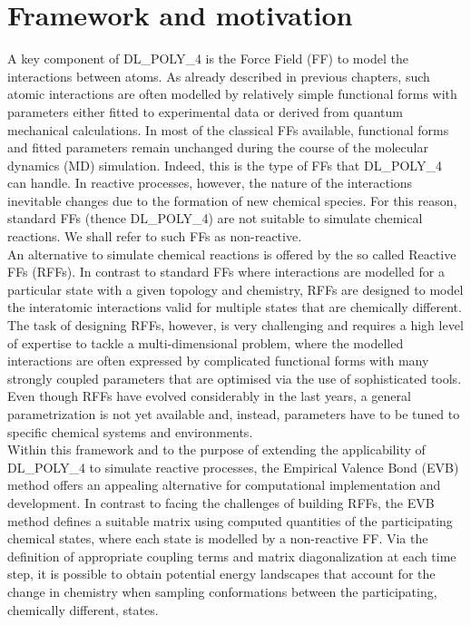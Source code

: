 \section{Framework and motivation}
A key component of DL\_POLY\_4 is the Force Field (FF) to model the interactions between atoms. As already described in previous chapters, such atomic interactions are often modelled by relatively simple functional forms with parameters either fitted to experimental data or derived from quantum mechanical calculations. In most of the classical FFs available, functional forms and fitted parameters remain unchanged during the course of the molecular dynamics (MD) simulation. Indeed, this is the type of FFs that DL\_POLY\_4 can handle. In reactive processes, however, the nature of the interactions inevitable changes due to the formation of new chemical species. For this reason, standard FFs (thence DL\_POLY\_4) are not suitable to simulate chemical reactions. We shall refer to such FFs as non-reactive.\\ 
An alternative to simulate chemical reactions is offered by the so called Reactive FFs (RFFs). In contrast to standard FFs where interactions are modelled for a particular state with a given topology and chemistry, RFFs are designed to model the interatomic interactions valid for multiple states that are chemically different. The task of designing RFFs, however, is very challenging and requires a high level of expertise to tackle a multi-dimensional problem, where the modelled interactions are often expressed by complicated functional forms with many strongly coupled parameters that are optimised via the use of sophisticated tools. Even though RFFs have evolved considerably in the last years, a general parametrization is not yet available and, instead, parameters have to be tuned to specific chemical systems and environments.\\
Within this framework and to the purpose of extending the applicability of DL\_POLY\_4 to simulate reactive processes, the Empirical Valence Bond (EVB) method \cite{duarte2017} offers an appealing alternative for computational implementation and development. In contrast to facing the challenges of building RFFs, the EVB method defines a suitable matrix using computed quantities of the participating chemical states, where each state is modelled by a non-reactive FF. Via the definition of appropriate coupling terms and matrix diagonalization at each time step, it is possible to obtain potential energy landscapes that account for the change in chemistry when sampling conformations between the participating, chemically different, states.\\
